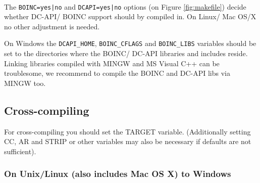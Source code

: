 \documentclass[a4paper,12pt,titlepage,dvipdfm]{article}
\begin{document}
\paragraph*{}The \texttt{BOINC=yes|no} and \texttt{DCAPI=yes|no} options (on Figure \ref{fig:makefile}) decide whether DC-API/ BOINC support should by compiled in. On Linux/ Mac OS/X no other adjustment is needed. 

On Windows the \texttt{DCAPI\_HOME}, \texttt{BOINC\_CFLAGS} and \texttt{BOINC\_LIBS} variables should be set to the directories where the BOINC/ DC-API libraries and includes reside. Linking libraries compiled with MINGW and MS Visual C++ can be troublesome, we recommend to compile the BOINC and DC-API libs via MINGW too.

\subsection{Cross-compiling}


For cross-compiling you should set the TARGET variable. (Additionally setting CC, AR and STRIP or other variables may also be necessary if defaults are not sufficient). 

\subsubsection{On Unix/Linux (also includes Mac OS X) to Windows}
\end{document}
